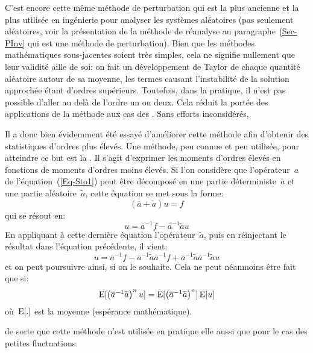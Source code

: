 \begin{histoire}
\medskip
C'est encore cette même méthode de perturbation qui est la plus ancienne et la plus utilisée en ingénierie pour analyser les systèmes aléatoires (pas seulement aléatoires, voir la présentation de la méthode de réanalyse au paragraphe~\ref{Sec-PInv} qui est une méthode de perturbation).
Bien que les méthodes mathématiques sous-jacentes soient très simples, cela ne signifie nullement que leur validité aille de soi: on fait un développement de Taylor de chaque quantité aléatoire autour de sa moyenne, les termes causant l'instabilité de la solution approchée étant d'ordres supérieurs. Toutefois, dans la pratique, il n'est pas possible d'aller au delà de l'ordre un ou deux. Cela réduit la portée des applications de la méthode aux cas des . Sans efforts inconsidérés, 

\medskip
Il a donc bien évidemment été essayé d'améliorer cette méthode afin d'obtenir des statistiques d'ordres plus élevés. Une méthode, peu connue et peu utilisée, pour atteindre ce but est la . Il s'agit d'exprimer les moments d'ordres élevés en fonctions de moments d'ordres moins élevés.
Si l'on considère que l'opérateur~$a$ de l'équation~(\ref{Eq-Sto1}) peut être décomposé en une partie déterministe~$\overline{a}$ et une partie aléatoire~$\widetilde{a}$, cette équation se met sous la forme:
\begin{equation}
(\overline{a}+\widetilde{a})u=f
\end{equation}
qui se résout en:
\begin{equation}
u=\overline{a}^{-1}f-\overline{a}^{-1}\widetilde{a}u
\end{equation}
En appliquant à cette dernière équation l'opérateur~$\widetilde{a}$, puis en réinjectant le résultat dans l'équation précédente, il vient:
\begin{equation}
u=\overline{a}^{-1}f-\overline{a}^{-1}\widetilde{a}\overline{a}^{-1}f+\overline{a}^{-1}\widetilde{a}\overline{a}^{-1}\widetilde{a}u
\end{equation}
et on peut poursuivre ainsi, si on le souhaite. Cela ne peut néanmoins être fait que si:
\begin{equation}\label{Eq-Unco}
\operatorname{E}[\begin{pmatrix}\overline{a}^{-1}\widetilde{a}\end{pmatrix}^nu] = \operatorname{E}[\begin{pmatrix}\overline{a}^{-1}\widetilde{a}\end{pmatrix}^n]\operatorname{E}[u]
\end{equation}
où~$\operatorname{E}[.]$ est la moyenne (espérance mathématique). 

  de sorte que cette méthode n'est utilisée en pratique elle aussi que pour le cas des petites fluctuations.
\end{histoire}

